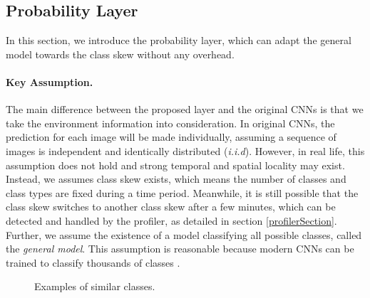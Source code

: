 \documentclass[pageno]{jpaper}
\begin{document}
\subsection{Probability Layer}
In this section, we introduce the probability layer, which can adapt the general model towards the class skew without any overhead.

\paragraph{Key Assumption.} 
The main difference between the proposed layer and the original CNNs is that we take the environment information into consideration. In original CNNs, the prediction for each image will be made individually, assuming a sequence of images is independent and identically distributed (\textit{i.i.d}). However, in real life, this assumption does not hold and strong temporal and spatial locality may exist. Instead, we assumes class skew exists, which means the number of classes and class types are fixed during a time period. Meanwhile, it is still possible that the class skew switches to another class skew after a few minutes, which can be detected and handled by the profiler, as detailed in section \ref{profilerSection}. Further, we assume the existence of a model classifying all possible classes, called the \textit{general model}. This assumption is reasonable because modern CNNs can be trained to classify thousands of classes \cite{krizhevsky2012imagenet, simonyan2014very, szegedy2015going, he2016deep, huang2017densely}.



   \begin{figure}
     \hfill
     \caption{Examples of similar classes.}
     \label{fig:exampleSimilar}
   \end{figure}
\end{document}
